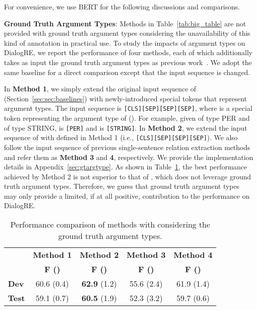 \documentclass[11pt,a4paper]{article}
\newcommand{\ie}{{i.e.}}
\begin{document}
For convenience, we use BERT for the following discussions and comparisons.



\medskip

\noindent \textbf{Ground Truth Argument Types}: Methods in Table~\ref{tab:big_table} are not provided with ground truth argument types considering the unavailability of this kind of annotation in practical use. To study the impacts of argument types on DialogRE, we report the performance of four methods, each of which additionally takes as input the ground truth argument types as previous work~\cite{zhang2017position,yao2019docred}. We adopt the same baseline for a direct comparison except that the input sequence is changed.


In \textbf{Method 1}, we simply extend the original input sequence of  (Section~\ref{sec:sec:baselines}) with newly-introduced special tokens that represent argument types. The input sequence is \texttt{[CLS]}\texttt{[SEP]}\texttt{[SEP]}\texttt{[SEP]}, where  is a special token representing the argument type of  (). For example, given  of type PER and  of type STRING,  is \texttt{[PER]} and  is \texttt{[STRING]}. In \textbf{Method 2}, we extend the input sequence of  with  defined in Method 1 (\ie, \texttt{[CLS]}\texttt{[SEP]}\texttt{[SEP]}\texttt{[SEP]}).
We also follow the input sequence of previous single-sentence relation extraction methods~\cite{shi2019simple,joshi2019spanbert} and refer them as \textbf{Method 3} and \textbf{4}, respectively. We provide the implementation details in Appendix~\ref{sec:gtargtype}. As shown in Table~\ref{tab:gtargtype}, the best performance achieved by Method 2 is not superior to that of , which does not leverage ground truth argument types. Therefore, we guess that ground truth argument types may only provide a limited, if at all positive, contribution to the performance on DialogRE.  


    


\begin{table}[h!]
\centering
\footnotesize
\begin{tabular}{lcccc}
\toprule
 & \bf Method 1 & \bf Method 2 & \bf Method 3 & \bf Method 4  \\
 & \bf F () & \bf F () & \bf F ()  & \bf F () \\
\midrule
\bf Dev    & 60.6 (0.4) & \textbf{62.9} (1.2) & 55.6 (2.4) & 61.9 (1.4) \\
\bf Test  & 59.1 (0.7) & \textbf{60.5} (1.9) & 52.3 (3.2) & 59.7 (0.6) \\ \bottomrule
\end{tabular}
\caption{Performance comparison of methods with considering the ground truth argument types.}


\label{tab:gtargtype}
\end{table}
\end{document}
